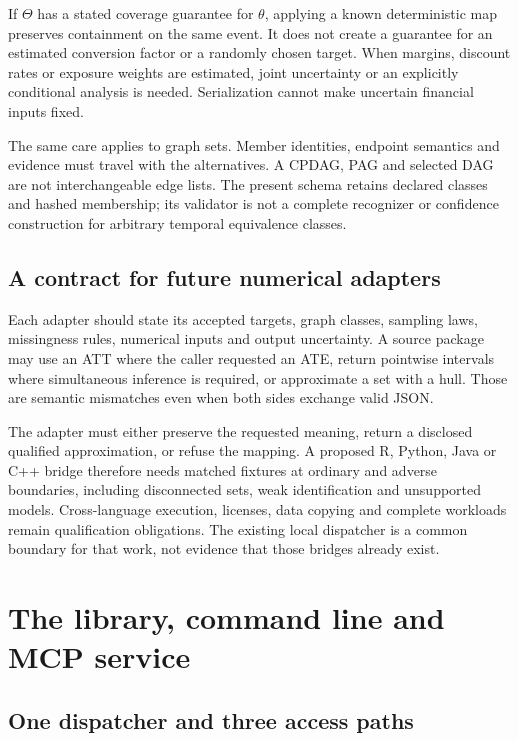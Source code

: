 If $\Theta$ has a stated coverage guarantee for $\theta$, applying a known
deterministic map preserves containment on the same event. It does not create
a guarantee for an estimated conversion factor or a randomly chosen target.
When margins, discount rates or exposure weights are estimated, joint
uncertainty or an explicitly conditional analysis is needed. Serialization
cannot make uncertain financial inputs fixed.

The same care applies to graph sets. Member identities, endpoint semantics and
evidence must travel with the alternatives. A CPDAG, PAG and selected DAG are
not interchangeable edge lists. The present schema retains declared classes
and hashed membership; its validator is not a complete recognizer or confidence
construction for arbitrary temporal equivalence classes.

\section{A contract for future numerical adapters}

Each adapter should state its accepted targets, graph classes, sampling laws,
missingness rules, numerical inputs and output uncertainty. A source package
may use an ATT where the caller requested an ATE, return pointwise intervals
where simultaneous inference is required, or approximate a set with a hull.
Those are semantic mismatches even when both sides exchange valid JSON.

The adapter must either preserve the requested meaning, return a disclosed
qualified approximation, or refuse the mapping. A proposed R, Python, Java or
C++ bridge therefore needs matched fixtures at ordinary and adverse boundaries,
including disconnected sets, weak identification and unsupported models.
Cross-language execution, licenses, data copying and complete workloads remain
qualification obligations. The existing local dispatcher is a common boundary
for that work, not evidence that those bridges already exist.

\chapter{The library, command line and MCP service}
\label{in:surfaces}

\section{One dispatcher and three access paths}

